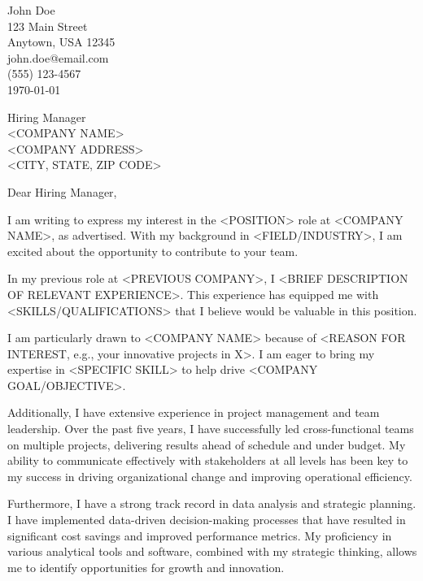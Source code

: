 \documentclass[
    language=english,
    doctype=cover-letter,
    institution=none,
    titlestyle=simple
]{../../omnilatex}
\begin{document}
\begin{minipage}{\textwidth}
    \raggedright
    John Doe\\
    123 Main Street\\
    Anytown, USA 12345\\
    john.doe@email.com\\
    (555) 123-4567\\
    \today
\end{minipage}

\vspace{1cm}

\begin{minipage}{\textwidth}
    \raggedright
    Hiring Manager\\
    <COMPANY NAME>\\
    <COMPANY ADDRESS>\\
    <CITY, STATE, ZIP CODE>
\end{minipage}

\vspace{1cm}

Dear Hiring Manager,

I am writing to express my interest in the <POSITION> role at <COMPANY NAME>, as advertised. With my background in <FIELD/INDUSTRY>, I am excited about the opportunity to contribute to your team.

In my previous role at <PREVIOUS COMPANY>, I <BRIEF DESCRIPTION OF RELEVANT EXPERIENCE>. This experience has equipped me with <SKILLS/QUALIFICATIONS> that I believe would be valuable in this position.

I am particularly drawn to <COMPANY NAME> because of <REASON FOR INTEREST, e.g., your innovative projects in X>. I am eager to bring my expertise in <SPECIFIC SKILL> to help drive <COMPANY GOAL/OBJECTIVE>.

Additionally, I have extensive experience in project management and team leadership. Over the past five years, I have successfully led cross-functional teams on multiple projects, delivering results ahead of schedule and under budget. My ability to communicate effectively with stakeholders at all levels has been key to my success in driving organizational change and improving operational efficiency.

Furthermore, I have a strong track record in data analysis and strategic planning. I have implemented data-driven decision-making processes that have resulted in significant cost savings and improved performance metrics. My proficiency in various analytical tools and software, combined with my strategic thinking, allows me to identify opportunities for growth and innovation.
\end{document}
